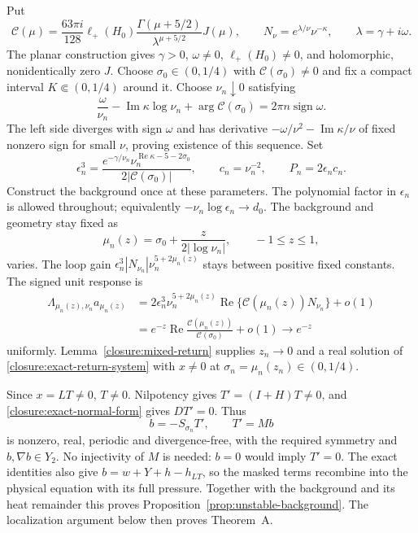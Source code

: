 Put
\[
 \mathcal C(\mu)=\frac{63\pi i}{128}
 \ell_+(H_0)\frac{\Gamma(\mu+5/2)}{\lambda^{\mu+5/2}}J(\mu),
 \qquad N_\nu=e^{\lambda/\nu}\nu^{-\kappa},
 \qquad \lambda=\gamma+i\omega.
\]
The planar construction gives $\gamma>0$, $\omega\ne0$,
$\ell_+(H_0)\ne0$, and holomorphic, nonidentically zero $J$.
Choose $\sigma_0\in(0,1/4)$ with $\mathcal C(\sigma_0)\ne0$ and
fix a compact interval $K\Subset(0,1/4)$ around it.
Choose $\nu_n\downarrow0$ satisfying
\[
 \frac{\omega}{\nu_n}-\operatorname{Im}\kappa\log\nu_n
       +\arg\mathcal C(\sigma_0)
   =2\pi n\operatorname{sign}\omega.
\]
The left side diverges with sign $\omega$ and has derivative
$-\omega/\nu^2-\operatorname{Im}\kappa/\nu$ of fixed nonzero sign
for small $\nu$, proving existence of this sequence. Set
\[
 \epsilon_n^3=
 \frac{e^{-\gamma/\nu_n}
       \nu_n^{\operatorname{Re}\kappa-5-2\sigma_0}}
      {2|\mathcal C(\sigma_0)|},
 \qquad c_n=\nu_n^{-2},\qquad P_n=2\epsilon_nc_n.
\]
Construct the background once at these parameters. The polynomial
factor in $\epsilon_n$ is allowed throughout; equivalently
$-\nu_n\log\epsilon_n\to d_0$. The background and geometry stay fixed
as
\[
 \mu_n(z)=\sigma_0+\frac{z}{2|\log\nu_n|},\qquad -1\le z\le1,
\]
varies. The loop gain
$\epsilon_n^3|N_{\nu_n}|\nu_n^{5+2\mu_n(z)}$
stays between positive fixed constants. The signed unit response is
\begin{align*}
 \Lambda_{\mu_n(z),\nu_n}a_{\mu_n(z)}
 &=2\epsilon_n^3\nu_n^{5+2\mu_n(z)}
       \operatorname{Re}\{\mathcal C(\mu_n(z))N_{\nu_n}\}+o(1)\\
 &=e^{-z}\operatorname{Re}
       \frac{\mathcal C(\mu_n(z))}{\mathcal C(\sigma_0)}+o(1)
 \longrightarrow e^{-z}
\end{align*}
uniformly. Lemma~\ref{closure:mixed-return} supplies $z_n\to0$
and a real solution of \eqref{closure:exact-return-system} with
$x\ne0$ at $\sigma_n=\mu_n(z_n)\in(0,1/4)$.

Since $x=LT\ne0$, $T\ne0$. Nilpotency gives $T'=(I+H)T\ne0$,
and \eqref{closure:exact-normal-form} gives $DT'=0$. Thus
\[
 b=-S_{\sigma_n}T',\qquad T'=Mb
\]
is nonzero, real, periodic and divergence-free, with the required symmetry
and $b,\nabla b\in Y_2$. No injectivity of $M$ is needed: $b=0$
would imply $T'=0$. The exact identities also give
$b=w+Y+h-h_{LT}$, so the masked terms recombine into the physical
equation with its full pressure. Together with the background and its
heat remainder this proves Proposition~\ref{prop:unstable-background}.
The localization argument below then proves Theorem~A.
